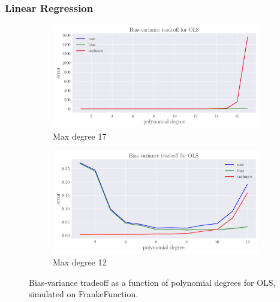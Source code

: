 \documentclass[a4paper]{article}
\begin{document}
	\subsubsection*{Linear Regression}
	
	\begin{figure}[h]
		
		\centering
		\begin{subfigure}{0.49\textwidth}
			\centering
			\includegraphics[width=\textwidth]{../output_extra/plots/bias_var_OLS_c17.pdf}
			\caption{Max degree 17}
			\label{fig:OLS_a}
		\end{subfigure}
		\hfill
		\begin{subfigure}{0.49\textwidth}
			\centering
			\includegraphics[width=\textwidth]{../output_extra/plots/bias_var_OLS_c12.pdf}
			\caption{Max degree 12}
			\label{fig:OLS_b}
		\end{subfigure}
		\caption{Bias-variance tradeoff as a function of polynomial degrees for OLS, simulated on FrankeFunction.}
		\label{fig:OLS}
	\end{figure}
	
\end{document}

